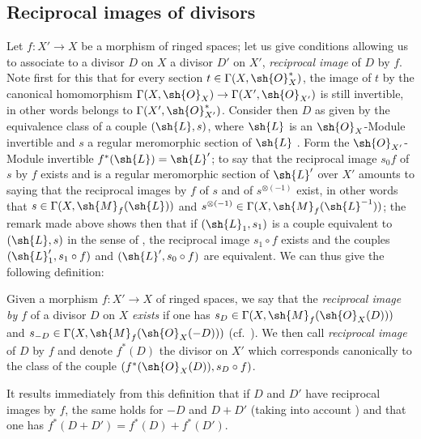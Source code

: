 \subsection{Reciprocal images of divisors}
\label{IV.21.4}

\begin{env}[21.4.1]
\label{IV.21.4.1}
Let $f:X'\to X$ be a morphism of ringed spaces;
let us give conditions allowing us to associate to a divisor $D$ on $X$ a divisor $D'$ on $X'$, \emph{reciprocal image} of $D$ by $f$.
Note first for this that for every section $t\in\Gamma(X,\sh{O}_X^*)$, the image of $t$ by the canonical homomorphism $\Gamma(X,\sh{O}_X)\to\Gamma(X',\sh{O}_{X'})$ is still invertible, in other words belongs to $\Gamma(X',\sh{O}_{X'}^*)$.
Consider then $D$ as given by the equivalence class of a couple $(\sh{L},s)$, where $\sh{L}$ is an $\sh{O}_X$-Module invertible and $s$ a regular meromorphic section of $\sh{L}$ .
Form the $\sh{O}_{X'}$-Module invertible $f^*(\sh{L})=\sh{L}'$;
to say that the reciprocal image $s_0 f$ of $s$ by $f$ exists  and is a regular meromorphic section of $\sh{L}'$ over $X'$ amounts to saying that the reciprocal images by $f$ of $s$ and of $s^{\otimes(-1)}$ exist, in other words that $s\in\Gamma(X,\sh{M}_f(\sh{L}))$ and $s^{\otimes(-1)}\in\Gamma(X,\sh{M}_f(\sh{L}^{-1}))$;
the remark made above shows then that if $(\sh{L}_1,s_1)$ is a couple equivalent to $(\sh{L},s)$ in the sense of , the reciprocal image $s_1\circ f$ exists and the couples $(\sh{L}'_1,s_1\circ f)$ and $(\sh{L}',s_0\circ f)$ are equivalent.
We can thus give the following definition:
\end{env}

\begin{definition}[21.4.2]
\label{IV.21.4.2}
Given a morphism $f:X'\to X$ of ringed spaces, we say that the \emph{reciprocal image by $f$} of a divisor $D$ on $X$ \emph{exists} if one has $s_D\in\Gamma(X,\sh{M}_f(\sh{O}_X(D)))$ and $s_{-D}\in\Gamma(X,\sh{M}_f(\sh{O}_X(-D)))$ (cf.\ ).
We then call \emph{reciprocal image} of $D$ by $f$ and denote $f^*(D)$ the divisor on $X'$ which corresponds canonically  to the class of the couple $(f^*(\sh{O}_X(D)),s_D\circ f)$.
\end{definition}

It results immediately from this definition that if $D$ and $D'$ have reciprocal images by $f$, the same holds for $-D$ and $D+D'$ (taking into account ) and that one has
$f^*(D+D')=f^*(D)+f^*(D')$.

